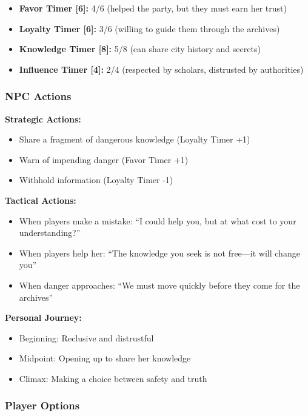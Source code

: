 \documentclass[10pt]{article}
\begin{document}
\begin{itemize}
  \item \textbf{Favor Timer [6]:} 4/6 (helped the party, but they must earn her trust)
  \item \textbf{Loyalty Timer [6]:} 3/6 (willing to guide them through the archives)
  \item \textbf{Knowledge Timer [8]:} 5/8 (can share city history and secrets)
  \item \textbf{Influence Timer [4]:} 2/4 (respected by scholars, distrusted by authorities)
\end{itemize}

\subsubsection{NPC Actions}

\textbf{Strategic Actions:}
\begin{itemize}
  \item Share a fragment of dangerous knowledge (Loyalty Timer +1)
  \item Warn of impending danger (Favor Timer +1)
  \item Withhold information (Loyalty Timer -1)
\end{itemize}

\textbf{Tactical Actions:}
\begin{itemize}
  \item When players make a mistake: ``I could help you, but at what cost to your understanding?''
  \item When players help her: ``The knowledge you seek is not free---it will change you''
  \item When danger approaches: ``We must move quickly before they come for the archives''
\end{itemize}

\textbf{Personal Journey:}
\begin{itemize}
  \item Beginning: Reclusive and distrustful
  \item Midpoint: Opening up to share her knowledge
  \item Climax: Making a choice between safety and truth
\end{itemize}

\subsubsection{Player Options}
\end{document}
